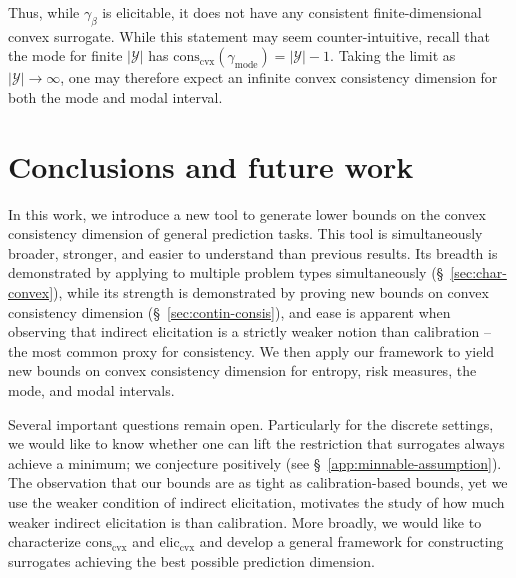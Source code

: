 \documentclass{article} %
\newcommand{\Comments}{0}
\newcommand{\mynote}[2]{\ifnum\Comments=1\textcolor{#1}{#2}\fi}
\newcommand{\jessie}[1]{\mynote{teal}{[JF: #1]}}
\newcommand{\reals}{\mathbb{R}}
\newcommand{\eliccvx}{\mathrm{elic}_\mathrm{cvx}}
\newcommand{\conscvx}{\mathrm{cons}_\mathrm{cvx}}
\newcommand{\Y}{\mathcal{Y}}
\newcommand{\mode}{\gamma_{\mathrm{mode}}}
\newcommand{\modal}{\gamma_\beta}
\begin{document}
Thus, while $\modal$ is elicitable, it does not have any consistent finite-dimensional convex surrogate.
While this statement may seem counter-intuitive, recall that the mode for finite $|\Y|$ has $\conscvx(\mode)=|\Y|-1$.
Taking the limit as $|\Y|\to\infty$, one may therefore expect an infinite convex consistency dimension for both the mode and modal interval.


\section{Conclusions and future work}\label{sec:conclusions}
In this work, we introduce a new tool to generate lower bounds on the convex consistency dimension of general prediction tasks.
This tool is simultaneously broader, stronger, and easier to understand than previous results.
Its breadth is demonstrated by applying to multiple problem types simultaneously (\S~\ref{sec:char-convex}), while its strength is demonstrated by proving new bounds on convex consistency dimension (\S~\ref{sec:contin-consis}), and ease is apparent when observing that indirect elicitation is a strictly weaker notion than calibration -- the most common proxy for consistency.
We then apply our framework to yield new bounds on convex consistency dimension for entropy, risk measures, the mode, and modal intervals.

Several important questions remain open.
Particularly for the discrete settings, we would like to know whether one can lift the restriction that surrogates always achieve a minimum; we conjecture positively (see \S~\ref{app:minnable-assumption}).
The observation that our bounds are as tight as calibration-based bounds, yet we use the weaker condition of indirect elicitation, motivates the study of how much weaker indirect elicitation is than calibration.
More broadly, we would like to characterize $\conscvx$ and $\eliccvx$ and develop a general framework for constructing surrogates achieving the best possible prediction dimension.
\end{document}
